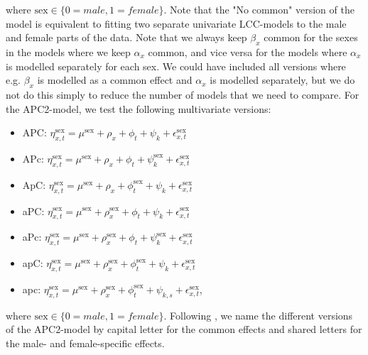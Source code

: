 where $\text{sex} \in \{0 = male, 1 = female\}$. Note that the "No common" version of the model is equivalent to fitting two separate univariate LCC-models to the male and female parts of the data. Note that we always keep $\beta_x$ common for the sexes in the models where we keep $\alpha_x$ common, and vice versa for the models where $\alpha_x$ is modelled separately for each sex. We could have included all versions where e.g. $\beta_x$ is modelled as a common effect and $\alpha_x$ is modelled separately, but we do not do this simply to reduce the number of models that we need to compare. For the APC2-model, we test the following multivariate versions:
\begin{itemize}
    \item APC: $\eta_{x,t}^{\text{sex}}= \mu^{\text{sex}} + \rho_x + \phi_t + \psi_k + \epsilon_{x,t}^{\text{sex}}$ 
    \item APc: $\eta_{x,t}^{\text{sex}}= \mu^{\text{sex}} + \rho_x + \phi_t + \psi_{k}^{\text{sex}} + \epsilon_{x,t}^{\text{sex}}$ 
    \item ApC: $\eta_{x,t}^{\text{sex}}= \mu^{\text{sex}} + \rho_x + \phi_{t}^{\text{sex}} + \psi_{k} + \epsilon_{x,t}^{\text{sex}}$ 
    \item aPC: $\eta_{x,t}^{\text{sex}}= \mu^{\text{sex}} + \rho_{x}^{\text{sex}} + \phi_{t} + \psi_{k} + \epsilon_{x,t}^{\text{sex}}$ 
    \item aPc: $\eta_{x,t}^{\text{sex}}= \mu^{\text{sex}} + \rho_{x}^{\text{sex}} + \phi_{t} + \psi_{k}^{\text{sex}} + \epsilon_{x,t}^{\text{sex}}$ 
    \item apC: $\eta_{x,t}^{\text{sex}}= \mu^{\text{sex}} + \rho_{x}^{\text{sex}} + \phi_{t}^{\text{sex}} + \psi_{k} + \epsilon_{x,t}^{\text{sex}}$ 
    \item apc: $\eta_{x,t}^{\text{sex}}= \mu^{\text{sex}} + \rho_{x}^{\text{sex}} + \phi_{t}^{\text{sex}} + \psi_{k, s} + \epsilon_{x,t}^{\text{sex}}$,
\end{itemize}
where $\text{sex} \in \{0 = male, 1 = female\}$. Following \textcite{rieblerHeld2010}, we name the different versions of the APC2-model by capital letter for the common effects and shared letters for the male- and female-specific effects.  

